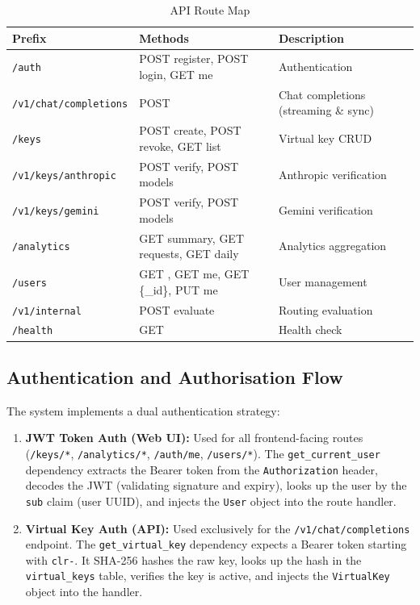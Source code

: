 \documentclass[12pt,a4paper]{report}
\begin{document}
\begin{table}[H]
    \centering
    \caption{API Route Map}
    \label{tab:routes}
    \begin{tabularx}{\textwidth}{l l X}
    \toprule
    \textbf{Prefix} & \textbf{Methods} & \textbf{Description} \\
    \midrule
    \texttt{/auth} & POST register, POST login, GET me & Authentication \\
    \texttt{/v1/chat/completions} & POST & Chat completions (streaming \& sync) \\
    \texttt{/keys} & POST create, POST revoke, GET list & Virtual key CRUD \\
    \texttt{/v1/keys/anthropic} & POST verify, POST models & Anthropic verification \\
    \texttt{/v1/keys/gemini} & POST verify, POST models & Gemini verification \\
    \texttt{/analytics} & GET summary, GET requests, GET daily & Analytics aggregation \\
    \texttt{/users} & GET \text{/}, GET me, GET \{\_id\}, PUT me & User management \\
    \texttt{/v1/internal} & POST evaluate & Routing evaluation \\
    \texttt{/health} & GET & Health check \\
    \bottomrule
    \end{tabularx}
\end{table}

\subsection{Authentication and Authorisation Flow}

The system implements a dual authentication strategy:

\begin{enumerate}[nosep]
    \item \textbf{JWT Token Auth (Web UI):} Used for all frontend-facing routes (\texttt{/keys/*}, \texttt{/analytics/*}, \texttt{/auth/me}, \texttt{/users/*}). The \texttt{get\_current\_user} dependency extracts the Bearer token from the \texttt{Authorization} header, decodes the JWT (validating signature and expiry), looks up the user by the \texttt{sub} claim (user UUID), and injects the \texttt{User} object into the route handler.
    \item \textbf{Virtual Key Auth (API):} Used exclusively for the \texttt{/v1/chat/completions} endpoint. The \texttt{get\_virtual\_key} dependency expects a Bearer token starting with \texttt{clr-}. It SHA-256 hashes the raw key, looks up the hash in the \texttt{virtual\_keys} table, verifies the key is active, and injects the \texttt{VirtualKey} object into the handler.
\end{enumerate}
\end{document}
